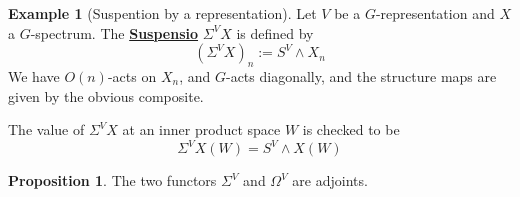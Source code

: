 \documentclass{article}
\theoremstyle{definition}
\theoremstyle{definition}
\theoremstyle{definition}
\theoremstyle{definition}
\newtheorem{proposition}{Proposition}[theorem]
\theoremstyle{definition}
\theoremstyle{definition}
\theoremstyle{definition}
\newtheorem{example}{Example}[theorem]
\begin{document}
\begin{tcolorbox}[colback=yellow!5!white,colframe=yellow!30!white]
\begin{example}[Suspention by a representation]
    Let $V$ be a $G$-representation and $X$ a $G$-spectrum. The \underline{\textbf{Suspensio}} $\Sigma^VX$ is defined by 
    \[(\Sigma^VX)_n:=S^V\wedge X_n\]
    We have $O(n)$-acts on $X_n$, and $G$-acts diagonally, and the structure maps are given by the obvious composite.

The value of $\Sigma^VX$ at an inner product space $W$ is checked to be 
\[\Sigma^VX(W)=S^V\wedge X(W)\]

\end{example}
\end{tcolorbox}


\begin{tcolorbox}[colback=blue!5!white,colframe=blue!30!white]
\begin{proposition}
The two functors $\Sigma^V$ and $\Omega^V$ are adjoints.
\end{proposition}
\end{tcolorbox}
\end{document}
